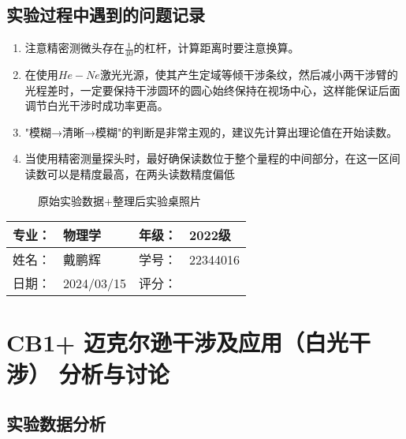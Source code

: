 \documentclass[dvipsnames, svgnames,a4paper,11pt]{article}
\begin{document}
\subsection{实验过程中遇到的问题记录}

\begin{enumerate}
	\item 注意精密测微头存在$\frac{1}{40}$的杠杆，计算距离时要注意换算。
	
	\item 在使用$He-Ne$激光光源，使其产生定域等倾干涉条纹，然后减小两干涉臂的光程差时，一定要保持干涉圆环的圆心始终保持在视场中心，这样能保证后面调节白光干涉时成功率更高。
	\item "模糊→清晰→模糊"的判断是非常主观的，建议先计算出理论值在开始读数。
	\item 当使用精密测量探头时，最好确保读数位于整个量程的中间部分，在这一区间读数可以是精度最高，在两头读数精度偏低
	
\end{enumerate}
	

	\begin{figure}[htbp]
		\centering
		\caption{原始实验数据+整理后实验桌照片}
		\label{fig:graph0}			
	\end{figure}
\clearpage
\begin{table}
	\renewcommand\arraystretch{1.7}
	\begin{tabularx}{\textwidth}{|X|X|X|X|}
	\hline
	专业：& 物理学 &年级：& 2022级\\
	\hline
	姓名： & 戴鹏辉 & 学号：& 22344016\\
	\hline
    日期：& 2024/03/15 & 评分： &\\
	\hline
	\end{tabularx}
\end{table}

\section{CB1+ \quad 迈克尔逊干涉及应用（白光干涉） \quad\heiti 分析与讨论}

\subsection{实验数据分析}
	
\end{document}

